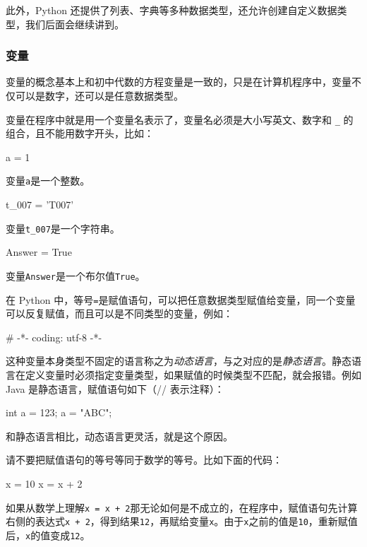 此外，Python
还提供了列表、字典等多种数据类型，还允许创建自定义数据类型，我们后面会继续讲到。

\hypertarget{ux53d8ux91cf}{%
\subsubsection{变量}\label{ux53d8ux91cf}}

变量的概念基本上和初中代数的方程变量是一致的，只是在计算机程序中，变量不仅可以是数字，还可以是任意数据类型。

变量在程序中就是用一个变量名表示了，变量名必须是大小写英文、数字和
\texttt{\_} 的组合，且不能用数字开头，比如：

\begin{pythoncode}
a = 1
\end{pythoncode}

变量\texttt{a}是一个整数。

\begin{pythoncode}
t_007 = 'T007'
\end{pythoncode}

变量\texttt{t\_007}是一个字符串。

\begin{pythoncode}
Answer = True
\end{pythoncode}

变量\texttt{Answer}是一个布尔值\texttt{True}。

在 Python
中，等号\texttt{=}是赋值语句，可以把任意数据类型赋值给变量，同一个变量可以反复赋值，而且可以是不同类型的变量，例如：

\begin{pythoncode}
# -*- coding: utf-8 -*-
\end{pythoncode}

这种变量本身类型不固定的语言称之为\emph{动态语言}，与之对应的是\emph{静态语言}。静态语言在定义变量时必须指定变量类型，如果赋值的时候类型不匹配，就会报错。例如
Java 是静态语言，赋值语句如下（// 表示注释）：

\begin{pythoncode}
int a = 123; 
a = "ABC"; 
\end{pythoncode}

和静态语言相比，动态语言更灵活，就是这个原因。

请不要把赋值语句的等号等同于数学的等号。比如下面的代码：

\begin{pythoncode}
x = 10
x = x + 2
\end{pythoncode}

如果从数学上理解\texttt{x\ =\ x\ +\ 2}那无论如何是不成立的，在程序中，赋值语句先计算右侧的表达式\texttt{x\ +\ 2}，得到结果\texttt{12}，再赋给变量\texttt{x}。由于\texttt{x}之前的值是\texttt{10}，重新赋值后，\texttt{x}的值变成\texttt{12}。

